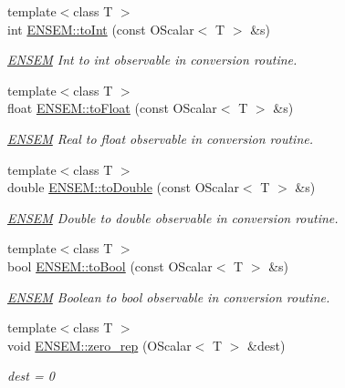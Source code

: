 \begin{DoxyCompactItemize}
\item 
{\footnotesize template$<$class T $>$ }\\int \mbox{\hyperlink{group__obsscalar_ga700ca25f1dbaeb36065859d474b4dbeb}{E\+N\+S\+E\+M\+::to\+Int}} (const O\+Scalar$<$ T $>$ \&s)
\begin{DoxyCompactList}\small\item\em \mbox{\hyperlink{namespaceENSEM}{E\+N\+S\+EM}} Int to int observable in conversion routine. \end{DoxyCompactList}\item 
{\footnotesize template$<$class T $>$ }\\float \mbox{\hyperlink{group__obsscalar_ga8a5fa51c51286eaa85647e050a9b3afd}{E\+N\+S\+E\+M\+::to\+Float}} (const O\+Scalar$<$ T $>$ \&s)
\begin{DoxyCompactList}\small\item\em \mbox{\hyperlink{namespaceENSEM}{E\+N\+S\+EM}} Real to float observable in conversion routine. \end{DoxyCompactList}\item 
{\footnotesize template$<$class T $>$ }\\double \mbox{\hyperlink{group__obsscalar_gad40ee3f4578e710aa6f83e848e14282b}{E\+N\+S\+E\+M\+::to\+Double}} (const O\+Scalar$<$ T $>$ \&s)
\begin{DoxyCompactList}\small\item\em \mbox{\hyperlink{namespaceENSEM}{E\+N\+S\+EM}} Double to double observable in conversion routine. \end{DoxyCompactList}\item 
{\footnotesize template$<$class T $>$ }\\bool \mbox{\hyperlink{group__obsscalar_ga8fa5feb767fc8b3814940792eddf13c8}{E\+N\+S\+E\+M\+::to\+Bool}} (const O\+Scalar$<$ T $>$ \&s)
\begin{DoxyCompactList}\small\item\em \mbox{\hyperlink{namespaceENSEM}{E\+N\+S\+EM}} Boolean to bool observable in conversion routine. \end{DoxyCompactList}\item 
{\footnotesize template$<$class T $>$ }\\void \mbox{\hyperlink{group__obsscalar_ga752f81e54e6f8f8362126b8d0668b340}{E\+N\+S\+E\+M\+::zero\+\_\+rep}} (O\+Scalar$<$ T $>$ \&dest)
\begin{DoxyCompactList}\small\item\em dest = 0 \end{DoxyCompactList}\item 

\end{DoxyCompactItemize}
